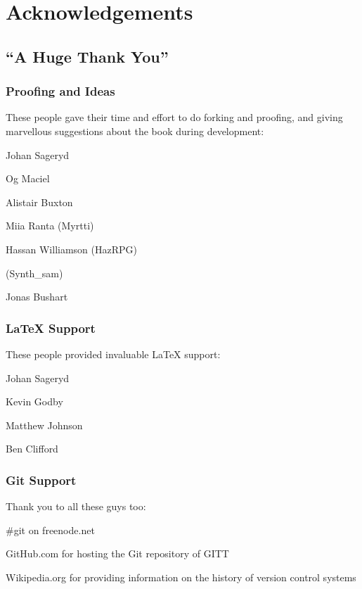 \chapter{Acknowledgements}
\section{``A Huge Thank You''}

\subsection{Proofing and Ideas}
These people gave their time and effort to do forking and proofing, and giving marvellous suggestions about the book during development:

Johan Sageryd

Og Maciel

Alistair Buxton

Miia Ranta (Myrtti)

Hassan Williamson (HazRPG)

(Synth\_sam)

Jonas Bushart

\subsection{\LaTeX{} Support}
These people provided invaluable \LaTeX{} support:

Johan Sageryd

Kevin Godby

Matthew Johnson

Ben Clifford

\subsection{Git Support}
Thank you to all these guys too:

\#git on freenode.net

GitHub.com for hosting the Git repository of GITT

Wikipedia.org for providing information on the history of version control systems

